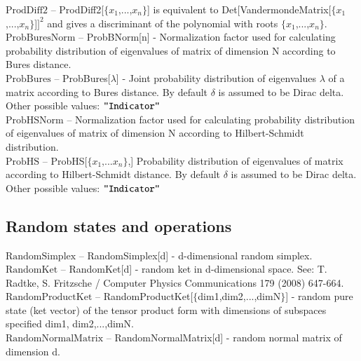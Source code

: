 \noindent\textbf{$ \text{ProdDiff2} $ }-- ProdDiff2[$\{$$ x_1 $,...,$ x_n $$\}$] is equivalent to Det[VandermondeMatrix[$\{$$ x_1 $,...,$ x_n $$\}$]$ ]^2 $ and gives a discriminant of the polynomial with roots $\{$$ x_1 $,...,$ x_n $$\}$.$  $\\

\noindent\textbf{$ \text{ProbBuresNorm} $ }-- ProbBNorm[n] - Normalization factor used for calculating probability distribution of eigenvalues of matrix of dimension N according to Bures distance.$  $\\

\noindent\textbf{$ \text{ProbBures} $ }-- ProbBures[$\lambda $] - Joint probability distribution of eigenvalues $\lambda $ of a matrix according to Bures distance. By default $\delta $ is assumed to be Dirac delta. Other possible values: $\texttt{"$ $Indicator$\texttt{"}$} $\\

\noindent\textbf{$ \text{ProbHSNorm} $ }-- Normalization factor used for calculating probability distribution of eigenvalues of matrix of dimension N according to Hilbert-Schmidt distribution.$  $\\

\noindent\textbf{$ \text{ProbHS} $ }-- ProbHS[$\{$$ x_1\text{,...}x_n $$\}$,] Probability distribution of eigenvalues of matrix according to Hilbert-Schmidt distance. By default $\delta $ is assumed to be Dirac delta. Other possible values: $\texttt{"$ $Indicator$\texttt{"}$} $\\

\subsection{Random states and operations}

\noindent\textbf{$ \text{RandomSimplex} $ }-- RandomSimplex[d] - d-dimensional random simplex.$  $\\

\noindent\textbf{$ \text{RandomKet} $ }-- RandomKet[d] - random ket in d-dimensional space. See: T. Radtke, S. Fritzsche / Computer Physics Communications 179 (2008) 647-664.$  $\\

\noindent\textbf{$ \text{RandomProductKet} $ }-- RandomProductKet[$\{$dim1,dim2,...,dimN$\}$] - random pure state (ket vector) of the tensor product form with dimensions of subspaces specified dim1, dim2,...,dimN.$  $\\

\noindent\textbf{$ \text{RandomNormalMatrix} $ }-- RandomNormalMatrix[d] - random normal matrix of dimension d.$  $\\

